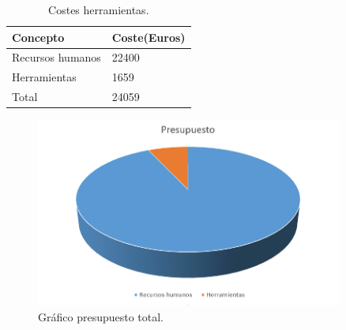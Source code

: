 \bigskip

\begin{table}[htb]
\begin{center}
\begin{tabular}{|l|l|}
\hline
Concepto & Coste(Euros) \\
\hline \hline
Recursos humanos & 22400 \\ \hline
Herramientas & 1659 \\ \hline
Total & 24059 \\ \hline
\end{tabular}
\caption{Costes herramientas.}
\end{center}
\end{table}

\begin{figure}
\centering
\includegraphics[width=0.9\textwidth]{imagenes/figuras/5_4.png}
\caption{Gráfico presupuesto total.}
\end{figure}
